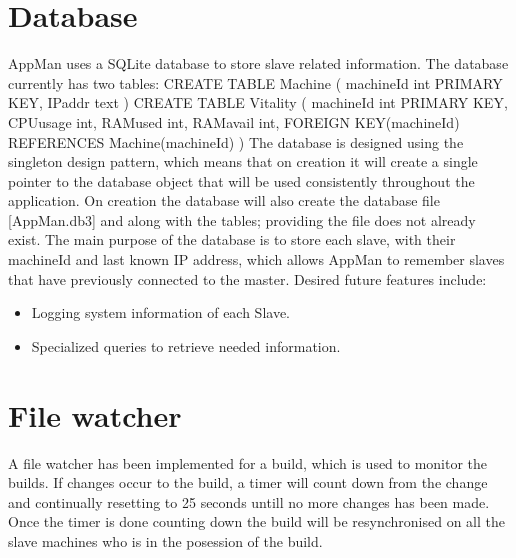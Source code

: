 \documentclass[a4paper,12pt,final]{article}
\begin{document}
\section{Database}
AppMan uses a SQLite database to store slave related information. The database currently has two tables:
\newline
\newline
CREATE TABLE Machine ( \newline
	machineId int	PRIMARY KEY, \newline
    IPaddr	text \newline
)
\newline
\newline
CREATE TABLE Vitality ( \newline
	machineId int	PRIMARY KEY, \newline
    CPUusage int, \newline
    RAMused int, \newline
    RAMavail int, \newline
    FOREIGN KEY(machineId) REFERENCES Machine(machineId) \newline
)
\newline
\newline
The database is designed using the singleton design pattern, which means that on creation it will create a single pointer to the database object that will be used consistently throughout the application.
\newline
\newline
On creation the database will also create the database file [AppMan.db3] and along with the tables; providing the file does not already exist.
\newline
\newline
The main purpose of the database is to store each slave, with their machineId and last known IP address, which allows AppMan to remember slaves that have previously connected to the master.
\newline
\newline
Desired future features include:
\begin{itemize}
\item Logging system information of each Slave.
\item Specialized queries to retrieve needed information.
\end{itemize}



\section{File watcher}
A file watcher has been implemented for a build, which is used to monitor the builds. If changes occur to the build, a timer will count down
from the change and continually resetting to 25 seconds untill no more changes has been made. Once the timer is done counting down the 
build will be resynchronised on all the slave machines who is in the posession of the build.
\end{document}
